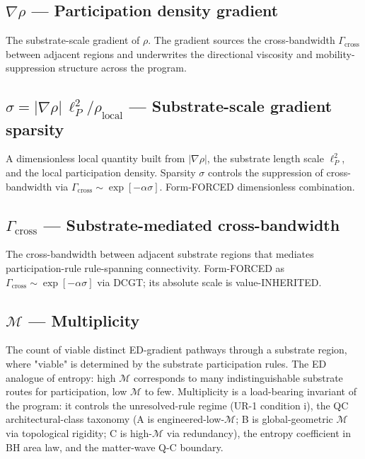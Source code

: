 \documentclass[11pt]{book}
\begin{document}
\subsection{$\nabla\rho$ — Participation density gradient}

The substrate-scale gradient of $\rho$. The gradient sources the cross-bandwidth $\Gamma_\mathrm{cross}$ between adjacent regions and underwrites the directional viscosity and mobility-suppression structure across the program.

\subsection{$\sigma = |\nabla\rho|\,\ell_P^2/\rho_\mathrm{local}$ — Substrate-scale gradient sparsity}

A dimensionless local quantity built from $|\nabla\rho|$, the substrate length scale $\ell_P^2$, and the local participation density. Sparsity $\sigma$ controls the suppression of cross-bandwidth via $\Gamma_\mathrm{cross}\sim\exp[-\alpha\sigma]$. Form-FORCED dimensionless combination.

\subsection{$\Gamma_\mathrm{cross}$ — Substrate-mediated cross-bandwidth}

The cross-bandwidth between adjacent substrate regions that mediates participation-rule rule-spanning connectivity. Form-FORCED as $\Gamma_\mathrm{cross}\sim\exp[-\alpha\sigma]$ via DCGT; its absolute scale is value-INHERITED.

\subsection{$\mathcal{M}$ — Multiplicity}

The count of viable distinct ED-gradient pathways through a substrate region, where "viable" is determined by the substrate participation rules. The ED analogue of entropy: high $\mathcal{M}$ corresponds to many indistinguishable substrate routes for participation, low $\mathcal{M}$ to few. Multiplicity is a load-bearing invariant of the program: it controls the unresolved-rule regime (UR-1 condition i), the QC architectural-class taxonomy (A is engineered-low-$\mathcal{M}$; B is global-geometric $\mathcal{M}$ via topological rigidity; C is high-$\mathcal{M}$ via redundancy), the entropy coefficient in BH area law, and the matter-wave Q-C boundary.
\end{document}

